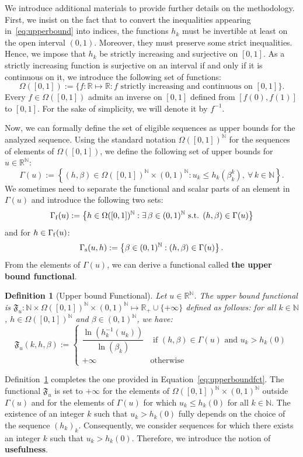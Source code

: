 \documentclass{article}
\def\funset{\Gamma}
\def\fset{\Omega([0,1])}
\def\secfunh{\funset_{\rm f}}
\def\secfunb{\funset_{\rm s}}
\def\Fu{\mathfrak{F}_u}
\def\rr{\mathbb R}
\def\nn{\mathbb N}
\newtheorem{defi}{Definition}
\def\blue#1{#1}
\begin{document}
\blue{We introduce additional materials to provide further details on the methodology. First, we insist on the fact that to convert the inequalities appearing in~\eqref{eq:upperbound} into indices, the functions $h_k$ must be invertible at least on the open interval $(0,1)$. Moreover, they must preserve some strict inequalities. Hence, we impose that $h_k$ be strictly increasing and surjective on $[0,1]$.  As a strictly increasing function is surjective on an interval if and only if it is continuous on it, we introduce the following set of functions: 
	\[
	\fset:=\{f:\rr\mapsto \rr : f \text{ strictly increasing and continuous on } [0,1]\}.
	\]
Every $f\in\fset$ admits an inverse on $[0,1]$ defined from $[f(0),f(1)]$ to $[0,1]$. For the sake of simplicity, we will denote it by $f^{-1}$. 
}
\blue{
Now, we can formally define the set of eligible sequences as upper bounds for the analyzed sequence. Using the standard notation $\fset^\nn$ for the sequences of elements of $\fset$, we define the following set of upper bounds for $u\in\rr^\nn$:
	\[
	\funset(u):=\left\{(h,\beta)\in \fset^\nn \times (0,1)^\nn: u_k\leq h_k(\beta_k^k),\ \forall\, k\in\nn\right\}. 
	\]
	We sometimes need to separate the functional and scalar parts of an element in $\funset(u)$ and introduce the following two sets:
	\[ 
	\secfunh(u):=\left\{h\in \fset^\nn : \exists\, \beta\in (0,1)^\nn \text{ s.t. } (h,\beta)\in \funset(u)\right\}
	\]
	and for $h\in\secfunh(u)$:
	\[ 
	\secfunb(u,h):=\left\{\beta\in (0,1)^\nn : (h,\beta)\in \funset(u)\right\}.
	\] 
	From the elements of $\funset(u)$, we can derive a functional called {\bf the upper bound functional}.   
	\begin{defi}[Upper bound Functional]
		\label{upperboundfun}
		Let $u\in\rr^\nn$. The upper bound functional is $\Fu:\nn\times \fset^\nn\times (0,1)^\nn\mapsto \rr_+\cup\{+\infty\}$ defined as follows: for all $k\in\nn$, $h\in\fset^\nn$ and $\beta\in (0,1)^\nn$, we have: 
		\begin{equation}
			\label{mainformulaaux}
			\Fu(k,h,\beta):=\left\{
			\begin{array}{lr}
				\dfrac{\ln(h_k^{-1}(u_k))}{\ln(\beta_k)} & \text{ if } (h,\beta)\in \funset(u)\text{ and } u_k>h_k(0)\\
				+\infty & \text{otherwise}
			\end{array}\right.
		\end{equation}
	\end{defi}
	Definition~\ref{upperboundfun} completes the one provided in Equation~\eqref{eq:upperboundfct}. The functional $\Fu$ is set to $+\infty$ for the elements of $\fset^\nn\times (0,1)^\nn$ outside $\funset(u)$ and for the elements of $\funset(u)$ for which $u_k\leq h_k(0)$ \blue{for all $k\in\nn$}. The existence of an integer $k$ such that $u_k>h_k(0)$ fully depends on the choice of the sequence $(h_k)_k$. Consequently, we consider sequences for which there exists an integer $k$ such that $u_k>h_k(0)$. Therefore, we introduce the notion of \textbf{usefulness}.
}
\end{document}
